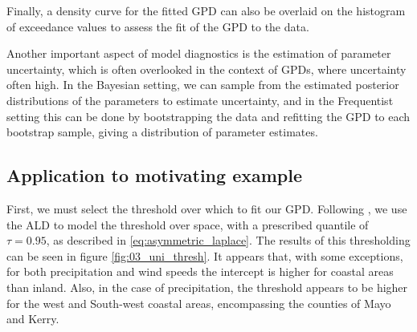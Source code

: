 \documentclass{article}
\numberwithin{equation}{section}
\begin{document}
Finally, a density curve for the fitted GPD can also be overlaid on the histogram of exceedance values to assess the fit of the GPD to the data.

Another important aspect of model diagnostics is the estimation of parameter uncertainty, which is often overlooked in the context of GPDs, where uncertainty often high.
In the Bayesian setting, we can sample from the estimated posterior distributions of the parameters to estimate uncertainty, and in the Frequentist setting this can be done by bootstrapping the data and refitting the GPD to each bootstrap sample, giving a distribution of parameter estimates.

\subsection{Application to motivating example} \label{subsec:uni_application}

First, we must select the threshold over which to fit our GPD. 
Following \citet{Youngman2019}, we use the ALD to model the threshold over space, with a prescribed quantile of $\tau = 0.95$, as described in \eqref{eq:asymmetric_laplace}.
The results of this thresholding can be seen in figure \ref{fig:03_uni_thresh}.
It appears that, with some exceptions, for both precipitation and wind speeds the intercept is higher for coastal areas than inland.
Also, in the case of precipitation, the threshold appears to be higher for the west and South-west coastal areas, encompassing the counties of Mayo and Kerry.
\end{document}
